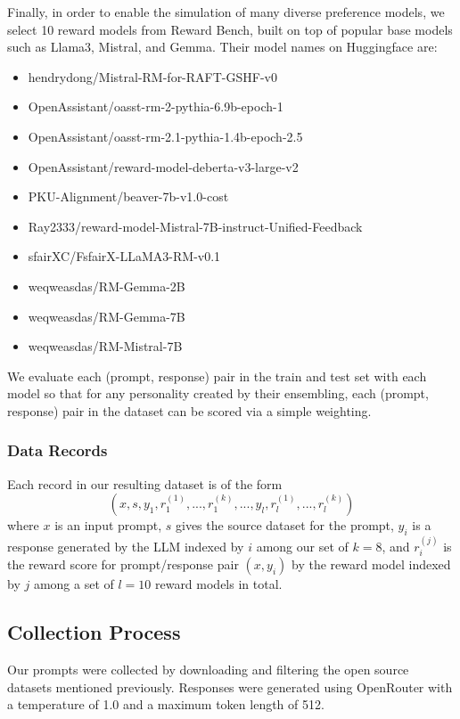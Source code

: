 Finally, in order to enable the simulation of many diverse preference models, we select 10 reward models from Reward Bench, built on top of popular base models such as Llama3, Mistral, and Gemma.  Their model names on Huggingface are:  

\begin{itemize}
    \item hendrydong/Mistral-RM-for-RAFT-GSHF-v0 
    \item OpenAssistant/oasst-rm-2-pythia-6.9b-epoch-1
    \item OpenAssistant/oasst-rm-2.1-pythia-1.4b-epoch-2.5
    \item OpenAssistant/reward-model-deberta-v3-large-v2
    \item PKU-Alignment/beaver-7b-v1.0-cost 
    \item Ray2333/reward-model-Mistral-7B-instruct-Unified-Feedback
    \item sfairXC/FsfairX-LLaMA3-RM-v0.1
    \item weqweasdas/RM-Gemma-2B 
    \item weqweasdas/RM-Gemma-7B 
    \item weqweasdas/RM-Mistral-7B 
\end{itemize}

We evaluate each (prompt, response) pair in the train and test set with each model so that for any personality created by their ensembling, each (prompt, response) pair in the dataset can be scored via a simple weighting.

\subsubsection{Data Records}

Each record in our resulting dataset is of the form
$$ (x,s,y_1,r_1^{(1)},...,r_1^{(k)},...,y_l,r_l^{(1)},...,r_l^{(k)}) $$
where $x$ is an input prompt, $s$ gives the source dataset for the prompt, $y_i$ is a response generated by the LLM indexed by $i$ among our set of $k=8$, and $r_i^{(j)}$ is the reward score for prompt/response pair $(x, y_i)$ by the reward model indexed by $j$ among a set of $l=10$ reward models in total.


\subsection{Collection Process}

Our prompts were collected by downloading and filtering the open source datasets mentioned previously.  Responses were generated using OpenRouter with a temperature of 1.0 and a maximum token length of 512.

